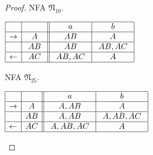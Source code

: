 \documentclass{llncs}
\newcommand{\fN}{{\mathfrak N}}
\begin{document}
\begin{example}
\begin{proof}
\begin{table}[hbt]
\begin{minipage}[b]{0.45\linewidth}
\caption{NFA $\fN_{10}$.}
\label{tab:fn10}
\begin{center}
$
\begin{array}{|c| c||c| c| }    
\hline
& \ \  \ \ 
&\ \ a \ \ &\ \ b \ \ \\
\hline  
\rightarrow & A
& \ AB \ & \ A \ \\
\hline  
 & AB
&  AB  & \  AB,AC \ \\
\hline  
\leftarrow & \ AC \
 & \ AB,AC \ & \ A \ \\
\hline  
\end{array}
$
\end{center}
\end{minipage}
\hspace{0.2cm}
\begin{minipage}[b]{0.45\linewidth}
\caption{NFA $\fN_{25}$.}
\label{tab:fn25}
\begin{center}
$
\begin{array}{|c| c||c| c| c|c|}    
\hline
& \ \  \ \ 
&\ \ a \ \ &\ \ b \ \   \\
\hline  
\rightarrow & \ A \
&  \ A,AB \  &  \  A  \   \\
\hline  
 & AB
&  \  A,AB \  & \ A,AB,AC \ \\
\hline  
\leftarrow & AC
&   \ A,AB,AC  \  &   A   \\
\hline  
\end{array}
$
\end{center}
\end{minipage}
\end{table}


\end{proof}
\end{example}
\end{document}
